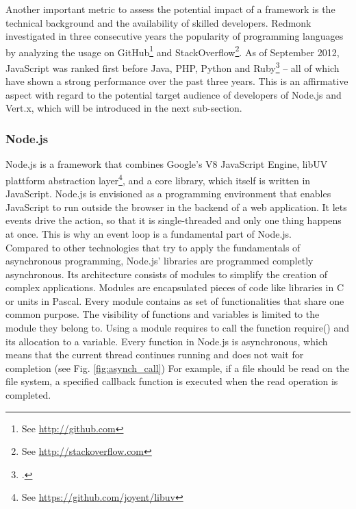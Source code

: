 Another important metric to assess the potential impact of a framework is the
technical background and the availability of skilled developers. Redmonk
investigated in three consecutive years the popularity of programming languages
by analyzing the usage on GitHub\footnote{See \url{http://github.com}} and
StackOverflow\footnote{See \url{http://stackoverflow.com}}. As of September
2012, JavaScript was ranked first before Java, PHP, Python and
Ruby\footcite[Cf.][]{Redmonk_2012} – all of which have shown a strong
performance over the past three years. This is an affirmative aspect with regard
to the potential target audience of developers of Node.js and Vert.x, which will
be introduced in the next sub-section.

\FloatBarrier

\subsubsection{Node.js}
\label{node.js}




Node.js is a framework that combines Google's V8 JavaScript Engine, 
libUV plattform abstraction layer\footnote{See \url{https://github.com/joyent/libuv}}, and a core library, which itself is written in JavaScript. 
Node.js is envisioned as a programming environment that enables JavaScript to run outside the browser in the backend of a web application. It lets events drive the
action, so that it is single-threaded and only one thing happens at once. This
is why an event loop is a fundamental part of Node.js.\\

Compared to other technologies that try to apply the fundamentals of asynchronous programming,
Node.js' libraries are programmed completly asynchronous. Its architecture consists of modules to simplify the
creation of complex applications. Modules are encapsulated pieces of code like libraries in C or units in Pascal. Every module contains as set of functionalities that share one common purpose. The visibility of functions and variables is limited to the module they belong to. Using a module requires to call the function require() and its allocation to a variable.
Every function in Node.js is asynchronous, which means that the current thread continues running and does not wait for completion (see Fig. \ref{fig:asynch_call}) For example, if a file should be read on the file system, a specified callback function is executed when the read operation is completed.\\


